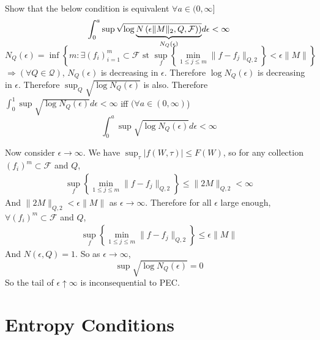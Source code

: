 \documentclass[11pt,letterpaper]{article}                  %
\begin{document}
\bigskip
\begin{problem}
Show that the below condition is equivalent $\forall a \in (0,\infty]$
\begin{equation*}
  \int_0^a \sup \sqrt{\smash[b]{  \log \underbrace{N\left(\epsilon
\|M\|_2,{Q},\mathcal{F})\right) }_{N_Q(\epsilon)}} }d\epsilon < \infty
\end{equation*}
\begin{equation*}
 N_Q(\epsilon) =\inf\left\{m:\exists (f_i)^m_{i=1} \subset \mathcal{F}\text{ st }
  \sup_f\left\{\min_{1\le j \le m}\|f-f_j\|_{Q,2}\right\} < \epsilon \|M\| \right\}
\end{equation*}
$\Rightarrow (\forall Q \in \mathcal{Q}) $, $N_Q(\epsilon)$ is
decreasing in $\epsilon$. Therefore $\log N_Q(\epsilon)$ is decreasing
in $\epsilon$. Therefore $\sup_{Q}\sqrt{\log N_Q(\epsilon)}$ is also.
Therefore $  \int_0^1 \sup \sqrt{  \log {N_Q(\epsilon)} } d\epsilon
< \infty$ iff $(\forall a \in (0,\infty)$)
\begin{equation*}
  \int_0^a \sup \sqrt{  \log {N_Q(\epsilon)} } d\epsilon < \infty
\end{equation*} 

Now consider $\epsilon \rightarrow \infty$. We have
$\sup_\tau|f(W,\tau)| \le F(W)$, so for any collection $(f_i)^m
\subset \mathcal{F}$ and $Q$, 
\begin{align*}
   \sup_f\left\{\min_{1\le j \le m}\|f-f_j\|_{Q,2}\right\}\le \|2M\|_{Q,2} < \infty
\end{align*}
And $\|2M\|_{Q,2} < \epsilon \|M \|$ as  $\epsilon \rightarrow
\infty$. Therefore for all $\epsilon$ large enough, $\forall (f_i)^m
\subset \mathcal{F}$ and $Q$,
\begin{align*}
   \sup_f\left\{\min_{1\le j \le m}\|f-f_j\|_{Q,2}\right\} \le
  \epsilon \|M\|
\end{align*}
And $N(\epsilon,Q)=1$. So as $\epsilon \rightarrow \infty$,
\begin{equation*}
   \sup \sqrt{  \log {N_Q(\epsilon)} } = 0
\end{equation*} 
So the tail of $\epsilon \uparrow \infty$ is inconsequential to PEC.

\end{problem}

\bigskip
\section{Entropy Conditions}
\end{document}
